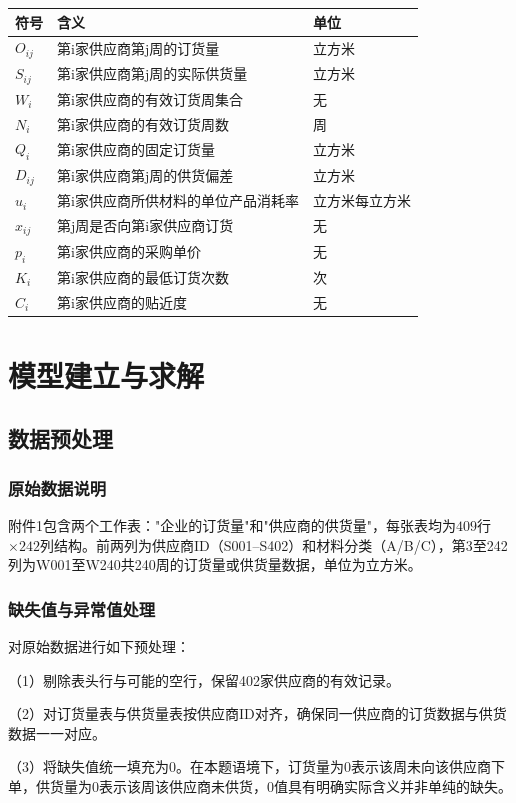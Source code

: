 \documentclass[12pt,a4paper]{ctexart}
\theoremstyle{definition}
\theoremstyle{plain}
\theoremstyle{remark}
\newenvironment{symboltable}
  {\begin{center}\zihao{5}\begin{tabular}{>{\centering\arraybackslash}p{3.5cm} p{7.5cm} >{\centering\arraybackslash}p{1.5cm}}
  \toprule
  \textbf{符号} & \textbf{含义} & \textbf{单位} \\
  \midrule}
  {\bottomrule\end{tabular}\end{center}}
\begin{document}
\begin{symboltable}
$O_{ij}$ & 第i家供应商第j周的订货量 & 立方米 \\
$S_{ij}$ & 第i家供应商第j周的实际供货量 & 立方米 \\
$W_i$ & 第i家供应商的有效订货周集合 & 无 \\
$N_i$ & 第i家供应商的有效订货周数 & 周 \\
$Q_i$ & 第i家供应商的固定订货量 & 立方米 \\
$D_{ij}$ & 第i家供应商第j周的供货偏差 & 立方米 \\
$u_i$ & 第i家供应商所供材料的单位产品消耗率 & 立方米每立方米 \\
$x_{ij}$ & 第j周是否向第i家供应商订货 & 无 \\
$p_i$ & 第i家供应商的采购单价 & 无 \\
$K_i$ & 第i家供应商的最低订货次数 & 次 \\
$C_i$ & 第i家供应商的贴近度 & 无 \\
\end{symboltable}


\section{模型建立与求解}

\subsection{数据预处理}

\subsubsection{原始数据说明}

附件1包含两个工作表："企业的订货量"和"供应商的供货量"，每张表均为$409$行$\times 242$列结构。前两列为供应商ID（S001--S402）和材料分类（A/B/C），第3至242列为W001至W240共240周的订货量或供货量数据，单位为立方米。

\subsubsection{缺失值与异常值处理}

对原始数据进行如下预处理：

（1）剔除表头行与可能的空行，保留402家供应商的有效记录。

（2）对订货量表与供货量表按供应商ID对齐，确保同一供应商的订货数据与供货数据一一对应。

（3）将缺失值统一填充为0。在本题语境下，订货量为0表示该周未向该供应商下单，供货量为0表示该周该供应商未供货，0值具有明确实际含义并非单纯的缺失。
\end{document}
